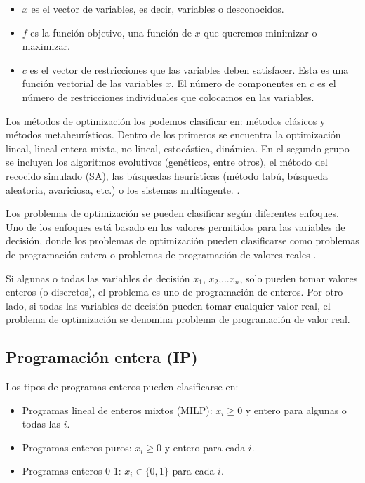 \begin{itemize}
    \item $x$ es el vector de variables, es decir, variables o desconocidos.
    \item$f$ es la función objetivo, una función de $x$ que queremos minimizar o maximizar.
    \item$c$ es el vector de restricciones que las variables deben satisfacer. Esta es una función vectorial de las variables $x$. El número de componentes en $c$ es el número de restricciones individuales que colocamos en las variables.
\end{itemize}

Los métodos de optimización los podemos clasificar en: métodos clásicos y métodos metaheurísticos. Dentro de los primeros se encuentra la optimización lineal, lineal entera mixta, no lineal, estocástica, dinámica. En el segundo grupo se incluyen los algoritmos evolutivos (genéticos, entre otros), el método del recocido simulado (SA), las búsquedas heurísticas (método tabú, búsqueda aleatoria, avariciosa, etc.) o los sistemas multiagente. \citep{Ramos2010ModelosOptimizacion}.

Los problemas de optimización se pueden clasificar según diferentes enfoques. Uno de los enfoques está basado en los valores permitidos para las variables de decisión, donde los problemas de optimización pueden clasificarse como problemas de programación entera o problemas de programación de valores reales \citep{Rao2009EngineeringEdition}.

Si algunas o todas las variables de decisión $x_1$, $x_2$,...$x_n$, solo pueden tomar valores enteros (o discretos), el problema es uno de programación de enteros. Por otro lado, si todas las variables de decisión pueden tomar cualquier valor real, el problema de optimización se denomina problema de programación de valor real.

\subsection{Programación entera (IP)}

Los tipos de programas enteros pueden clasificarse en:
\begin{itemize}
    \item Programas lineal de enteros mixtos (MILP): $x_i \geq 0$ y entero para algunas o todas las $i$. 
    \item Programas enteros puros: $x_i \geq 0$ y entero para cada $i$.
    \item Programas enteros 0-1: $x_i \in \{0,1\}$ para cada $i$.
\end{itemize}

